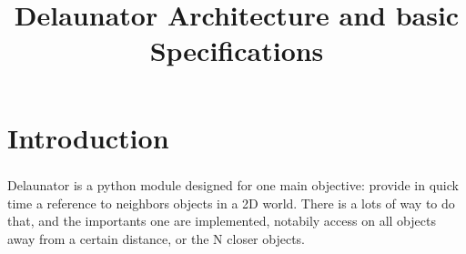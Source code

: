 \documentclass{report}
\title{Delaunator Architecture and basic Specifications}
\author{}
\date{}
\begin{document}
        \maketitle




\chapter{Introduction}
    \paragraph*{}
    Delaunator is a python module designed for one main objective: provide in quick time a reference to neighbors objects in a 2D world.
    There is a lots of way to do that, and the importants one are implemented, notabily access on all objects away from a certain distance, 
    or the N closer objects.
\end{document}
